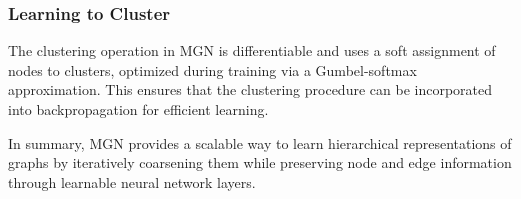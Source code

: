 \subsubsection{Learning to Cluster}

The clustering operation in MGN is differentiable and uses a soft assignment of nodes to clusters, optimized during training via a Gumbel-softmax approximation. This ensures that the clustering procedure can be incorporated into backpropagation for efficient learning.

In summary, MGN provides a scalable way to learn hierarchical representations of graphs by iteratively coarsening them while preserving node and edge information through learnable neural network layers.
